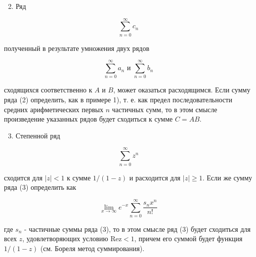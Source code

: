 \documentclass[10pt]{article}
\begin{document}
\begin{enumerate}

  \setcounter{enumi}{1}

  \item Ряд

\end{enumerate}



\[

\sum_{n=0}^{\infty} c_{n}

\]



полученный в результате умножения двух рядов



\[

\sum_{n=0}^{\infty} a_{n} \text { и } \sum_{n=0}^{\infty} b_{n}

\]



сходящихся соответственно к $A$ и $B$, может оказаться расходящимся. Если сумму ряда (2) определить, как в примере 1), т. е. как предел последовательности средних арифметических первых $n$ частичных сумм, то в этом смысле произведение указанных рядов будет сходиться к сумме $C=A B$.



\begin{enumerate}

  \setcounter{enumi}{2}

  \item Степенной ряд

\end{enumerate}



\[

\sum_{n=0}^{\infty} z^{n}

\]



сходится для $|z|<1$ к сумме $1 /(1-z)$ и расходится для $|z| \geqslant 1$. Если же сумму ряда (3) определить как



\[

\lim _{x \rightarrow \infty} e^{-x} \sum_{n=0}^{\infty} \frac{s_{n} x^{n}}{n !}

\]



где $s_{n}$ - частичные суммы ряда (3), то в этом смысле ряд (3) будет сходиться для всех $z$, удовлетворяющих условию $\mathrm{Rez}<1$, причем его суммой будет функция $1 /(1-z)$ (см. Бореля метод суммирования).
\end{document}
